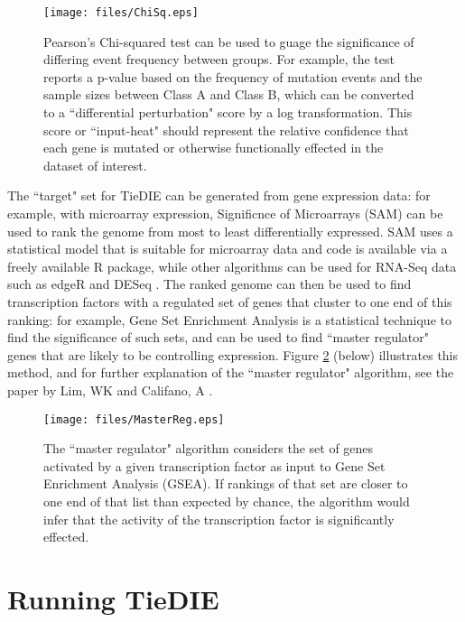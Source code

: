 \documentclass[11pt]{report}
\begin{document}
\begin{figure}[h]
    \texttt{[image: files/ChiSq.eps]}
	\caption{Pearson's Chi-squared test can be used to guage the significance of differing event frequency between groups. For example, the test reports a p-value based
	on the frequency of mutation events and the sample sizes between Class A and Class B, which can be converted to a ``differential perturbation" score by a log transformation. This score or ``input-heat" should represent the relative confidence that each gene is mutated or otherwise functionally effected in the dataset of interest.}
    \label{fig:chisq}
\end{figure}

\clearpage

\noindent The ``target" set for TieDIE can be generated from gene expression data: for example, with microarray expression, Significnce of Microarrays (SAM) \cite{SAM} can be used to rank the genome from most to least differentially expressed. SAM uses a statistical model that is suitable for microarray data and code is available via a freely available R package, while other algorithms can be used for RNA-Seq data
such as edgeR \cite{edgeR} and DESeq \cite{DESeq}. The ranked genome can then be used to find transcription factors with a regulated 
set of genes that cluster to one end of this ranking: for example, Gene Set Enrichment Analysis \cite{Subramanian05} is a statistical 
technique to find the significance of such sets, and can be used to find ``master regulator" genes that are likely to be controlling expression. Figure \ref{fig:masterreg} (below) illustrates this method, and for further explanation of the ``master regulator" algorithm, see the paper by Lim, WK and Califano, A \cite{MR_Califano}. 


\begin{figure}[h]
    \texttt{[image: files/MasterReg.eps]}
	\caption{The ``master regulator" algorithm considers the set of genes activated by a given transcription factor as input to Gene Set Enrichment Analysis (GSEA). If rankings
	of that set are closer to one end of that list than expected by chance, the algorithm would infer that the activity of the transcription factor is significantly effected.} 
    \label{fig:masterreg}
\end{figure}

\clearpage

\section{Running TieDIE}
\end{document}
